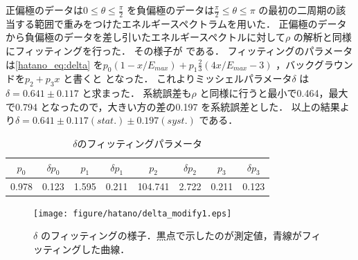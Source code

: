 正偏極のデータは$0\leq\theta\leq\frac{\pi}{2}$ を負偏極のデータは$\frac{\pi}{2}\leq\theta\leq\pi$ の最初の二周期の該当する範囲で重みをつけたエネルギースペクトラムを用いた．
正偏極のデータから負偏極のデータを差し引いたエネルギースペクトルに対して$\rho$ の解析と同様にフィッティングを行った．
その様子が である．
フィッティングのパラメータは\eqref{hatano_eq:delta} を$p_0(1-x/E_{max})+p_1\frac{2}{3}(4x/E_{max}-3)$ ，バックグラウンドを$p_2+p_3x$ と書くと となった．
これよりミッシェルパラメータ$\delta$ は$\delta=0.641\pm0.117$ と求まった．
系統誤差も$\rho$ と同様に行うと最小で0.464，最大で0.794 となったので，大きい方の差の0.197 を系統誤差とした．
以上の結果より$\delta=0.641\pm0.117 (stat.) \pm0.197 (syst.)$ である．

\begin{table}[hbt]
\centering
\caption{$\delta$のフィッティングパラメータ}
\begin{tabular}{cccccccc}
$p_0$ & $\delta p_0$ & $p_1$ & $\delta p_1$ & $p_2$ & $\delta p_2$ & $p_3$ & $\delta p_3$ \\ \hline
0.978 & 0.123 & 1.595 & 0.211 & 104.741 & 2.722 & 0.211 & 0.123 \\
\end{tabular}
\label{hatano_tab:delta}
\end{table}

\begin{figure}[hbt]
\centering
\texttt{[image: figure/hatano/delta\_modify1.eps]}
\caption{$\delta$ のフィッティングの様子．黒点で示したのが測定値，青線がフィッティングした曲線．}
\label{hatano_fig:delta}
\end{figure}

%

